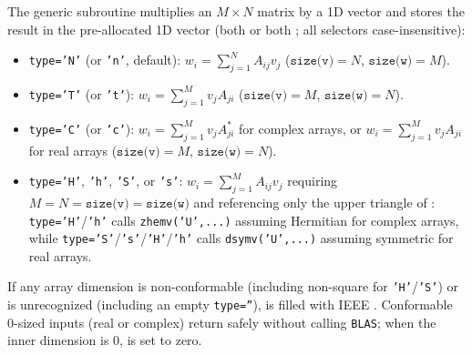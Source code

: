 The generic subroutine  multiplies an $M\times N$ matrix  by a 1D vector  and stores the result in the pre-allocated 1D vector  (both  or both ; all  selectors case-insensitive):
\begin{itemize}
  \item \texttt{type='N'} (or \texttt{'n'}, default): $w_i = \sum_{j=1}^{N} A_{ij} v_j$ ($\texttt{size(v)}=N$, $\texttt{size(w)}=M$).
  \item \texttt{type='T'} (or \texttt{'t'}): $w_i = \sum_{j=1}^{M} v_j A_{ji}$ ($\texttt{size(v)}=M$, $\texttt{size(w)}=N$).
  \item \texttt{type='C'} (or \texttt{'c'}): $w_i = \sum_{j=1}^{M} v_j A_{ji}^*$ for complex arrays, or $w_i = \sum_{j=1}^{M} v_j A_{ji}$ for real arrays ($\texttt{size(v)}=M$, $\texttt{size(w)}=N$).
  \item \texttt{type='H'}, \texttt{'h'}, \texttt{'S'}, or \texttt{'s'}: $w_i = \sum_{j=1}^{M} A_{ij} v_j$ requiring $M = N = \texttt{size(v)} = \texttt{size(w)}$ and referencing only the upper triangle of : \texttt{type='H'}/\texttt{'h'} calls \texttt{zhemv('U',...)} assuming Hermitian  for complex arrays, while \texttt{type='S'}/\texttt{'s'}/\texttt{'H'}/\texttt{'h'} calls \texttt{dsymv('U',...)} assuming symmetric  for real arrays.
\end{itemize}
If any array dimension is non-conformable (including non-square  for \texttt{'H'}/\texttt{'S'}) or  is unrecognized (including an empty \texttt{type=''}),  is filled with IEEE . Conformable 0-sized inputs (real or complex) return safely without calling \texttt{BLAS}; when the inner dimension is $0$,  is set to zero.

\begin{description}[leftmargin=2.2cm, style=nextline]
\end{description}


